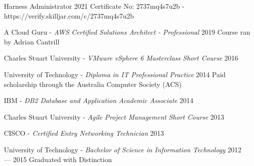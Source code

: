 
\begin{education}
  \eduitem
  {Harness Administrator} %
  {2021} %
  {Certificate No: 2737mq4s7u2b - https://verify.skilljar.com/c/2737mq4s7u2b} %

  \eduitem
  {A Cloud Guru - \emph{AWS Certified Solutions Architect - Professional}} %
  {2019} %
  {Course ran by Adrian Cantrill} %

  \eduitem
  {Charles Stuart University - \emph{VMware vSphere 6 Masterclass Short Course}} %
  {2016} %
  {} %
  
  \eduitem
  {University of Technology - \emph{Diploma in IT Professional Practice}} %
  {2014} %
  {Paid scholarship through the Australia Computer Society (ACS)} %

  \eduitem
  {IBM - \emph{DB2 Database and Application Academic Associate}} %
  {2014} %
  {} %
  
  \eduitem
  {Charles Stuart University - \emph{Agile Project Management Short Course}} %
  {2013} %
  {} %

  \eduitem
  {CISCO - \emph{Certified Entry Networking Technician}} %
  {2013} %
  {} %

  \eduitem
  {University of Technology - \emph{Bachelor of Science in Information Technology}} %
  {2012 --- 2015} %
  {Graduated with Distinction} %


\end{education}
